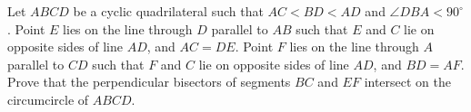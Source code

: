 Let $ABCD$ be a cyclic quadrilateral such that $AC < BD < AD$ and $\angle DBA < 90^\circ$. Point $E$ lies on the line through $D$ parallel to $AB$ such that $E$ and $C$ lie on opposite sides of line $AD$, and $AC = DE$. Point $F$ lies on the line through $A$ parallel to $CD$ such that $F$ and $C$ lie on opposite sides of line $AD$, and $BD = AF$. Prove that the perpendicular bisectors of segments $BC$ and $EF$ intersect on the circumcircle of $ABCD$.
